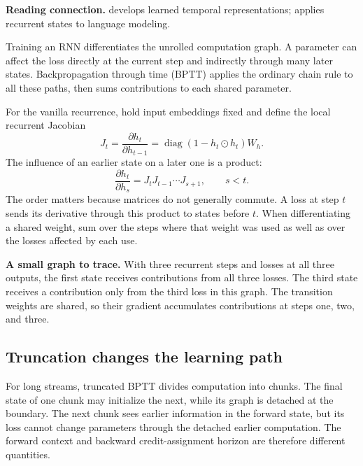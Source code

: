 \textbf{Reading connection.}  develops learned temporal
representations;  applies recurrent states to language modeling.

Training an RNN differentiates the unrolled computation graph. A parameter
can affect the loss directly at the current step and indirectly through
many later states. Backpropagation through time (BPTT) applies the ordinary
chain rule to all these paths, then sums contributions to each shared parameter.


For the vanilla recurrence, hold input embeddings fixed and define the
local recurrent Jacobian
\[
 J_t=\frac{\partial h_t}{\partial h_{t-1}}
 =\operatorname{diag}(1-h_t\odot h_t)W_h.
\]
The influence of an earlier state on a later one is a product:
\[
 \frac{\partial h_t}{\partial h_s}=J_tJ_{t-1}\cdots J_{s+1},\qquad s<t.
\]
The order matters because matrices do not generally commute. A loss at
step $t$ sends its derivative through this product to states before $t$.
When differentiating a shared weight, sum over the steps where that weight
was used as well as over the losses affected by each use.

\textbf{A small graph to trace.} With three recurrent steps and losses at
all three outputs, the first state receives contributions from all three
losses. The third state receives a contribution only from the third loss
in this graph. The transition weights are shared, so their gradient
accumulates contributions at steps one, two, and three.

\subsection*{Truncation changes the learning path}
For long streams, truncated BPTT divides computation into chunks. The
final state of one chunk may initialize the next, while its graph is
detached at the boundary. The next chunk sees earlier information in the
forward state, but its loss cannot change parameters through the detached
earlier computation. The forward context and backward credit-assignment
horizon are therefore different quantities.

